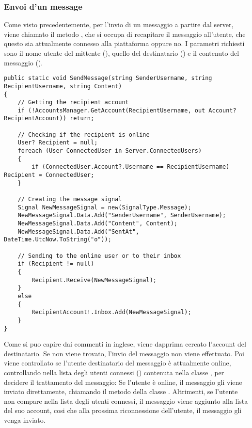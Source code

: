 \documentclass{article}
\begin{document}
\subsubsection{Envoi d'un message}

Come visto precedentemente, per l'invio di un messaggio a partire dal server, viene chiamato il metodo , che si occupa di recapitare il messaggio all'utente, che questo sia attualmente connesso alla piattaforma oppure no. I parametri richiesti sono il nome utente del mittente (), quello del destinatario () e il contenuto del messaggio ().

\begin{verbatim}
public static void SendMessage(string SenderUsername, string RecipientUsername, string Content)
{
	// Getting the recipient account
	if (!AccountsManager.GetAccount(RecipientUsername, out Account? RecipientAccount)) return;
	
	// Checking if the recipient is online
	User? Recipient = null;
	foreach (User ConnectedUser in Server.ConnectedUsers)
	{
		if (ConnectedUser.Account?.Username == RecipientUsername) Recipient = ConnectedUser;
	}
	
	// Creating the message signal
	Signal NewMessageSignal = new(SignalType.Message);
	NewMessageSignal.Data.Add("SenderUsername", SenderUsername);
	NewMessageSignal.Data.Add("Content", Content);
	NewMessageSignal.Data.Add("SentAt", DateTime.UtcNow.ToString("o"));
	
	// Sending to the online user or to their inbox
	if (Recipient != null)
	{
		Recipient.Receive(NewMessageSignal);
	}
	else
	{
		RecipientAccount!.Inbox.Add(NewMessageSignal);
	}
}
\end{verbatim}

Come si puo capire dai commenti in inglese, viene dapprima cercato l'account  del destinatario. Se non viene trovato, l'invio del messaggio non viene effettuato.
Poi viene controllato se l'utente destinatario del messaggio è attualmente online, controllando nella lista degli utenti connessi () contenuta nella classe , per decidere il trattamento del messaggio:
Se l'utente è online, il messaggio gli viene inviato direttamente, chiamando il metodo  della classe .
Altrimenti, se l'utente non compare nella lista degli utenti connessi, il messaggio viene aggiunto alla lista  del suo account, cosi che alla prossima riconnessione dell'utente, il messaggio gli venga inviato.
\end{document}
